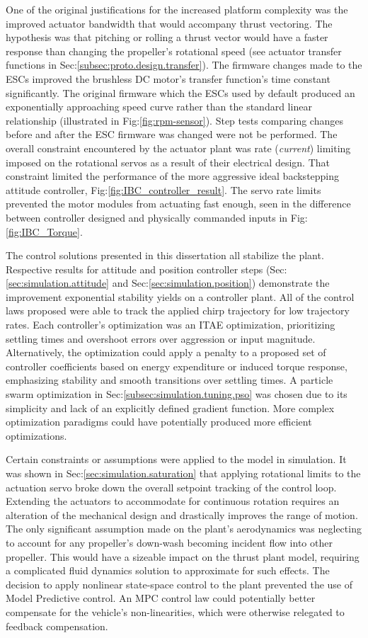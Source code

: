 \par
One of the original justifications for the increased platform complexity was the improved actuator bandwidth that would accompany thrust vectoring. The hypothesis was that pitching or rolling a thrust vector would have a faster response than changing the propeller's rotational speed (see actuator transfer functions in Sec:\ref{subsec:proto.design.transfer}). The firmware changes made to the ESCs improved the brushless DC motor's transfer function's time constant significantly. The original firmware which the ESCs used by default produced an exponentially approaching speed curve rather than the standard linear relationship (illustrated in Fig:\ref{fig:rpm-sensor}). Step tests comparing changes before and after the ESC firmware was changed were not be performed. The overall constraint encountered by the actuator plant was rate (\emph{current}) limiting imposed on the rotational servos as a result of their electrical design. That constraint limited the performance of the more aggressive ideal backstepping attitude controller, Fig:\ref{fig:IBC_controller_result}. The servo rate limits prevented the motor modules from actuating fast enough, seen in the difference between controller designed and physically commanded inputs in Fig:\ref{fig:IBC_Torque}.
\par
The control solutions presented in this dissertation all stabilize the plant. Respective results for attitude and position controller steps (Sec:\ref{sec:simulation.attitude} and Sec:\ref{sec:simulation.position}) demonstrate the improvement exponential stability yields on a controller plant. All of the control laws proposed were able to track the applied chirp trajectory for low trajectory rates. Each controller's optimization was an ITAE optimization, prioritizing settling times and overshoot errors over aggression or input magnitude. Alternatively, the optimization could apply a penalty to a proposed set of controller coefficients based on energy expenditure or induced torque response, emphasizing stability and smooth transitions over settling times. A particle swarm optimization in Sec:\ref{subsec:simulation.tuning.pso} was chosen due to its simplicity and lack of an explicitly defined gradient function. More complex optimization paradigms could have potentially produced more efficient optimizations.
\par
Certain constraints or assumptions were applied to the model in simulation. It was shown in Sec:\ref{sec:simulation.saturation} that applying rotational limits to the actuation servo broke down the overall setpoint tracking of the control loop. Extending the actuators to accommodate for continuous rotation requires an alteration of the mechanical design and drastically improves the range of motion. The only significant assumption made on the plant's aerodynamics was neglecting to account for any propeller's down-wash becoming incident flow into other propeller. This would have a sizeable impact on the thrust plant model, requiring a complicated fluid dynamics solution to approximate for such effects. The decision to apply nonlinear state-space control to the plant prevented the use of Model Predictive control. An MPC control law could potentially better compensate for the vehicle's non-linearities, which were otherwise relegated to feedback compensation.
